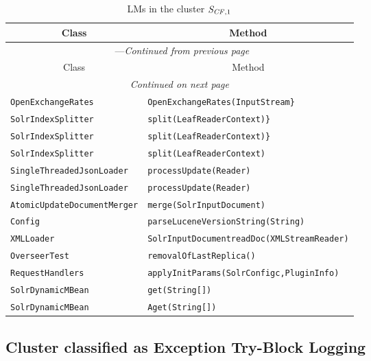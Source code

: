 \begin{center}
\begin{longtable}{ll}
\caption{LMs in the cluster $\mathit{S}_{\mathit{CF},1}$}\\
\toprule\multicolumn{1}{c}{Class}&\multicolumn{1}{c}{Method}\\\midrule
\endfirsthead

\multicolumn{2}{c}{\tablename\ \thetable{}---\textit{Continued from previous page}} \\\midrule
\multicolumn{1}{c}{Class}&\multicolumn{1}{c}{Method}\\\midrule
\endhead
\multicolumn{2}{c}{\textit{Continued on next page}}\\\midrule
\endfoot
\bottomrule
\endlastfoot

\lstinline/OpenExchangeRates/&{\lstinline/OpenExchangeRates(InputStream}/}\\
\lstinline/SolrIndexSplitter/&{\lstinline/split(LeafReaderContext)}/}\\
\lstinline/SolrIndexSplitter/&{\lstinline/split(LeafReaderContext)}/}\\
\lstinline/SolrIndexSplitter/&{\lstinline/split(LeafReaderContext)/}\\
\lstinline/SingleThreadedJsonLoader/&{\lstinline/processUpdate(Reader)/}\\
\lstinline/SingleThreadedJsonLoader/&{\lstinline/processUpdate(Reader)/}\\
\lstinline/AtomicUpdateDocumentMerger/&{\lstinline/merge(SolrInputDocument)/}\\
\lstinline/Config/&{\lstinline/parseLuceneVersionString(String)/}\\
\lstinline/XMLLoader/&{\lstinline/SolrInputDocumentreadDoc(XMLStreamReader)/}\\
\lstinline/OverseerTest/&{\lstinline/removalOfLastReplica()/}\\
\lstinline/RequestHandlers/&{\lstinline/applyInitParams(SolrConfigc,PluginInfo)/}\\
\lstinline/SolrDynamicMBean/&{\lstinline/get(String[])/}\\
\lstinline/SolrDynamicMBean/&{\lstinline/Aget(String[])/}\\
\end{longtable}
\end{center}

\subsection{Cluster classified as Exception Try-Block Logging}

